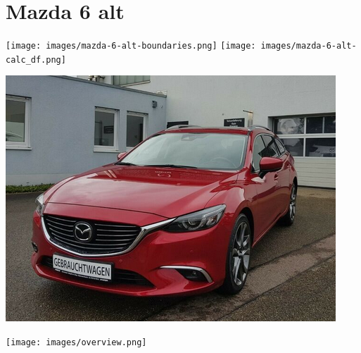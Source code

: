 \documentclass[landscape, DIV=99]{scrartcl}
\begin{document}
\pagebreak


\twocolumn

\section*{Mazda 6 alt}
\begin{center}
\texttt{[image: images/mazda-6-alt-boundaries.png]}
\null
\vspace{0.5cm}
\texttt{[image: images/mazda-6-alt-calc\_df.png]}
\end{center}

\pagebreak
\null
\vspace{2cm}
\begin{center}
\includegraphics[width=0.9\columnwidth]{cars/mazda-6-alt.png}
\end{center}

\pagebreak



\pagebreak

\onecolumn
\null
\vfill 
\begin{center}
\texttt{[image: images/overview.png]}
\end{center}
\vfill 
\end{document}

